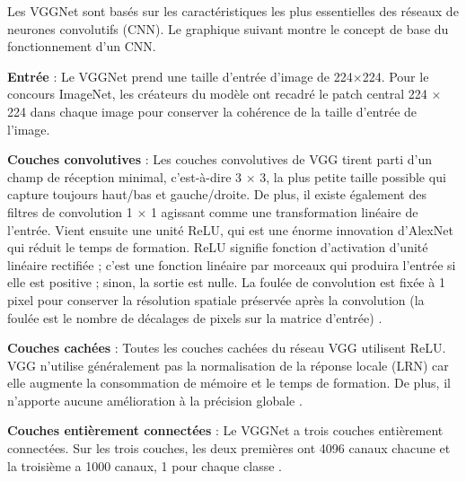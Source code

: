 	Les VGGNet sont basés sur les caractéristiques les plus essentielles des réseaux de neurones convolutifs (CNN). Le graphique suivant montre le concept de base du fonctionnement d'un CNN.
	
	
	\begin{list}{--}{Un bref coup d'œil à l'architecture de VGG :}
		\item \textbf{Entrée} : Le VGGNet prend une taille d'entrée d'image de 224×224. Pour le concours ImageNet, les créateurs du modèle ont recadré le patch central 224 × 224 dans chaque image pour conserver la cohérence de la taille d'entrée de l'image\cite{simonyan2014very}.
		
		\item \textbf{Couches convolutives }: Les couches convolutives de VGG tirent parti d'un champ de réception minimal, c'est-à-dire 3 × 3, la plus petite taille possible qui capture toujours haut/bas et gauche/droite. De plus, il existe également des filtres de convolution 1 × 1 agissant comme une transformation linéaire de l'entrée. Vient ensuite une unité ReLU, qui est une énorme innovation d'AlexNet qui réduit le temps de formation. ReLU signifie fonction d'activation d'unité linéaire rectifiée ; c'est une fonction linéaire par morceaux qui produira l'entrée si elle est positive ; sinon, la sortie est nulle. La foulée de convolution est fixée à 1 pixel pour conserver la résolution spatiale préservée après la convolution (la foulée est le nombre de décalages de pixels sur la matrice d'entrée)   \cite{tammina2019transfer}.
		
		\item \textbf{Couches cachées} : Toutes les couches cachées du réseau VGG utilisent ReLU. VGG n'utilise généralement pas la normalisation de la réponse locale (LRN) car elle augmente la consommation de mémoire et le temps de formation. De plus, il n'apporte aucune amélioration à la précision globale \cite{tammina2019transfer}.
		
		\item \textbf{Couches entièrement connectées} : Le VGGNet a trois couches entièrement connectées. Sur les trois couches, les deux premières ont 4096 canaux chacune et la troisième a 1000 canaux, 1 pour chaque classe \cite{tammina2019transfer}.
	
	\end{list}
	

